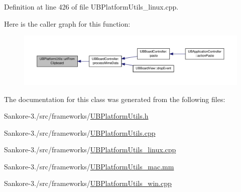 Definition at line 426 of file U\-B\-Platform\-Utils\-\_\-linux.\-cpp.



Here is the caller graph for this function\-:
\nopagebreak
\begin{figure}[H]
\begin{center}
\leavevmode
\includegraphics[width=350pt]{d4/d99/class_u_b_platform_utils_a88ed38d0cded54f10a54d9ad46f77002_icgraph}
\end{center}
\end{figure}




The documentation for this class was generated from the following files\-:\begin{DoxyCompactItemize}
\item 
Sankore-\/3./src/frameworks/\hyperlink{_u_b_platform_utils_8h}{U\-B\-Platform\-Utils.\-h}\item 
Sankore-\/3./src/frameworks/\hyperlink{_u_b_platform_utils_8cpp}{U\-B\-Platform\-Utils.\-cpp}\item 
Sankore-\/3./src/frameworks/\hyperlink{_u_b_platform_utils__linux_8cpp}{U\-B\-Platform\-Utils\-\_\-linux.\-cpp}\item 
Sankore-\/3./src/frameworks/\hyperlink{_u_b_platform_utils__mac_8mm}{U\-B\-Platform\-Utils\-\_\-mac.\-mm}\item 
Sankore-\/3./src/frameworks/\hyperlink{_u_b_platform_utils__win_8cpp}{U\-B\-Platform\-Utils\-\_\-win.\-cpp}\end{DoxyCompactItemize}
